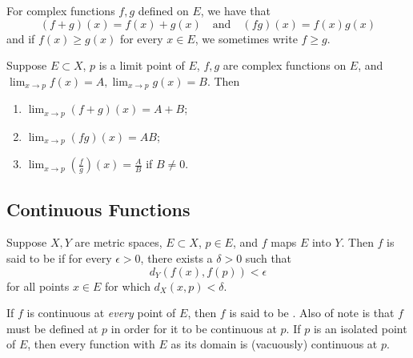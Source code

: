 \documentclass{article}
\begin{document}
\begin{definition}
    For complex functions $f,g$ defined on $E$, we have that 
    \[(f+g)(x)=f(x)+g(x)\quad\textrm{and}\quad (fg)(x)=f(x)g(x)\]
    and if $f(x)\geq g(x)$ for every $x\in E$, we sometimes write $f\geq g$.
\end{definition}
\begin{theorem}
    Suppose $E\subset X$, $p$ is a limit point of $E$, $f,g$ are complex functions on $E$, and $\lim_{x\rightarrow p}f(x)=A, \lim_{x\rightarrow p}g(x)=B$. Then
    \begin{enumerate}
        \item $\lim_{x\rightarrow p}(f+g)(x)=A+B$;
        \item $\lim_{x\rightarrow p}(fg)(x)=AB$;
        \item $\lim_{x\rightarrow p}\left(\frac{f}{g}\right)(x)=\frac{A}{B}$ if $B\neq 0$.
    \end{enumerate}
\end{theorem}

\subsection{Continuous Functions}
\begin{definition}
    Suppose $X,Y$ are metric spaces, $E\subset X$, $p\in E$, and $f$ maps $E$ into $Y$. Then $f$ is said to be  if for every $\epsilon>0$, there exists a $\delta>0$ such that \[d_{Y}(f(x),f(p))<\epsilon\]for all points $x\in E$ for which $d_{X}(x,p)<\delta$.
\end{definition}
\begin{remark}
    \begin{itemize}
        \ii If $f$ is continuous at \textit{every} point of $E$, then $f$ is said to be . 
        \ii Also of note is that $f$ must be defined at $p$ in order for it to be continuous at $p$. 
        \ii If $p$ is an isolated point of $E$, then every function with $E$ as its domain is (vacuously) continuous at $p$.
    \end{itemize}
\end{remark}
\end{document}

